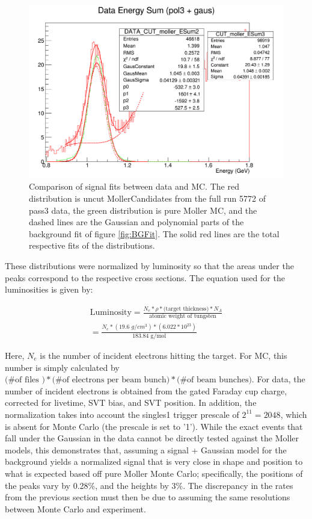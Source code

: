 \documentclass{article}
\begin{document}
	\begin{figure}[H]
  	\includegraphics[width=\linewidth]{c1.png}
  	\caption{Comparison of signal fits between data and MC. The red distribution is uncut MollerCandidates from the full run 5772 of pass3 data, the green distribution is pure Moller MC, and the dashed lines are the Gaussian and polynomial parts of the background fit of figure \ref{fig:BGFit}. The solid red lines are the total respective fits of the distributions.}
  	\label{fig:DataMCFit}
	\end{figure}

These distributions were normalized by luminosity so that the areas under the peaks correspond to the respective cross sections. The equation used for the luminosities is given by:

	\begin{equation} \label{eq:Lumin}
	\begin{split}
  	\mbox{Luminosity} = \frac{N_e*\rho*\mbox{(target thickness)}*N_A}{\mbox{atomic weight of tungsten}}\\
  	= \frac{N_e*(\mbox{19.6 }g/cm^{3})*(6.022*10^{23})}{\mbox{183.84 g/mol}}
  	\end{split}
	\end{equation}

Here, $N_e$ is the number of incident electrons hitting the target. For MC, this number is simply calculated by $\mbox{(\# of files )}*\mbox{(\# of electrons per beam bunch)}*\mbox{(\# of beam bunches)}$. For data, the number of incident electrons is obtained from the gated Faraday cup charge, corrected for livetime, SVT bias, and SVT position. In addition, the normalization takes into account the singles1 trigger prescale of $2^{11} = 2048$, which is absent for Monte Carlo (the prescale is set to '1'). While the exact events that fall under the Gaussian in the data cannot be directly tested against the Moller models, this demonstrates that, assuming a signal + Gaussian model for the background yields a normalized signal that is very close in shape and position to what is expected based off pure Moller Monte Carlo; specifically, the positions of the peaks vary by 0.28\%, and the heights by 3\%. The discrepancy in the rates from the previous section must then be due to assuming the same resolutions between Monte Carlo and experiment.
\end{document}
